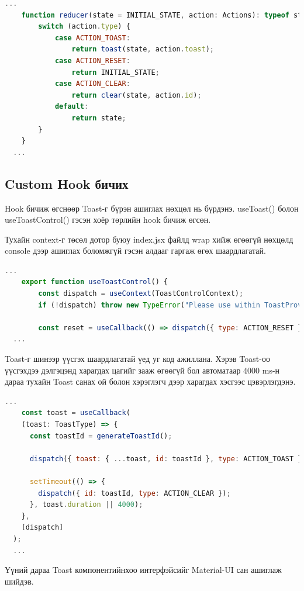 \begin{lstlisting}[language=Javascript, caption=useReducer дээр ажиллах үйлдлүүдийг заах, frame=single]
	...  
	function reducer(state = INITIAL_STATE, action: Actions): typeof state {
		switch (action.type) {
			case ACTION_TOAST:
				return toast(state, action.toast);
			case ACTION_RESET:
				return INITIAL_STATE;
			case ACTION_CLEAR:
				return clear(state, action.id);
			default:
				return state;
		}
	}
  ...
\end{lstlisting}

\subsection{Custom Hook бичих}

Hook бичиж өгснөөр Toast-г бүрэн ашиглах нөхцөл нь бүрдэнэ. useToast() болон useToastControl() гэсэн хоёр төрлийн hook бичиж өгсөн. 

Тухайн context-г төсөл дотор буюу index.jsx файлд wrap хийж өгөөгүй нөхцөлд console дээр ашиглах боломжгүй гэсэн алдааг гаргаж өгөх шаардлагатай.

\begin{lstlisting}[language=Javascript, caption=Context-г буруу ашигласан үед алдаа гаргах, frame=single]
	...  
	export function useToastControl() {
		const dispatch = useContext(ToastControlContext);
		if (!dispatch) throw new TypeError("Please use within ToastProvider");

		const reset = useCallback(() => dispatch({ type: ACTION_RESET }), [dispatch]);
  ...
\end{lstlisting}

Toast-г шинээр үүсгэх шаардлагатай үед уг код ажиллана. Хэрэв Toast-оо үүсгэхдээ дэлгэцэнд харагдах цагийг зааж өгөөгүй бол автоматаар 4000 ms-н дараа тухайн Toast санах ой болон хэрэглэгч дээр харагдах хэсгээс цэвэрлэгдэнэ.

\begin{lstlisting}[language=Javascript, caption=Toast үүсгэх үүрэгтэй hook, frame=single]
	...  
	const toast = useCallback(
    (toast: ToastType) => {
      const toastId = generateToastId();

      dispatch({ toast: { ...toast, id: toastId }, type: ACTION_TOAST });

      setTimeout(() => {
        dispatch({ id: toastId, type: ACTION_CLEAR });
      }, toast.duration || 4000);
    },
    [dispatch]
  );
  ...
\end{lstlisting}

Үүний дараа Toast компонентийнхоо интерфэйсийг Material-UI сан ашиглаж шийдэв.


